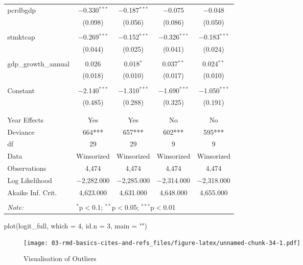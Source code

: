 \documentclass[a4paper,nobind]{templates/ociamthesis}
\newenvironment{Shaded}{\begin{snugshade}}{\end{snugshade}}
\newcommand{\AttributeTok}[1]{\textcolor[rgb]{0.77,0.63,0.00}{#1}}
\newcommand{\DecValTok}[1]{\textcolor[rgb]{0.00,0.00,0.81}{#1}}
\newcommand{\FunctionTok}[1]{\textcolor[rgb]{0.00,0.00,0.00}{#1}}
\newcommand{\NormalTok}[1]{#1}
\newcommand{\StringTok}[1]{\textcolor[rgb]{0.31,0.60,0.02}{#1}}
\renewenvironment{Shaded}
{
  \vspace{10pt}%
  \begin{snugshade}%
}{%
  \end{snugshade}%
  \vspace{8pt}%
}
\begin{document}
\begin{table}[!htbp]
\begin{tabular}{@{\extracolsep{5pt}}lcccc}
 pcrdbgdp & $-$0.330$^{***}$ & $-$0.187$^{***}$ & $-$0.075 & $-$0.048 \\ 
  & (0.098) & (0.056) & (0.086) & (0.050) \\ 
  & & & & \\ 
 stmktcap & $-$0.269$^{***}$ & $-$0.152$^{***}$ & $-$0.326$^{***}$ & $-$0.183$^{***}$ \\ 
  & (0.044) & (0.025) & (0.041) & (0.024) \\ 
  & & & & \\ 
 gdp\_growth\_annual & 0.026 & 0.018$^{*}$ & 0.037$^{**}$ & 0.024$^{**}$ \\ 
  & (0.018) & (0.010) & (0.017) & (0.010) \\ 
  & & & & \\ 
 Constant & $-$2.140$^{***}$ & $-$1.310$^{***}$ & $-$1.690$^{***}$ & $-$1.050$^{***}$ \\ 
  & (0.485) & (0.288) & (0.325) & (0.191) \\ 
  & & & & \\ 
\hline \\[-1.8ex] 
Year Effects & Yes & Yes & No & No \\ 
Deviance & 664*** & 657*** & 602*** & 595*** \\ 
df & 29 & 29 & 9 & 9 \\ 
Data & Winsorized & Winsorized & Winsorized & Winsorized \\ 
Observations & 4,474 & 4,474 & 4,474 & 4,474 \\ 
Log Likelihood & $-$2,282.000 & $-$2,285.000 & $-$2,314.000 & $-$2,318.000 \\ 
Akaike Inf. Crit. & 4,623.000 & 4,631.000 & 4,648.000 & 4,655.000 \\ 
\hline 
\hline \\[-1.8ex] 
\textit{Note:}  & \multicolumn{4}{l}{$^{*}$p$<$0.1; $^{**}$p$<$0.05; $^{***}$p$<$0.01} \\ 
\end{tabular} 
\end{table}

\begin{landscape}

\begin{Shaded}
\begin{Highlighting}[]
\FunctionTok{plot}\NormalTok{(logit\_full, }\AttributeTok{which =} \DecValTok{4}\NormalTok{, }\AttributeTok{id.n =} \DecValTok{3}\NormalTok{, }\AttributeTok{main =} \StringTok{""}\NormalTok{)}
\end{Highlighting}
\end{Shaded}

\begin{figure}
\centering
\texttt{[image: 03-rmd-basics-cites-and-refs\_files/figure-latex/unnamed-chunk-34-1.pdf]}
\caption{\label{fig:unnamed-chunk-34}Visualisation of Outliers}
\end{figure}

\end{landscape}
\end{document}
